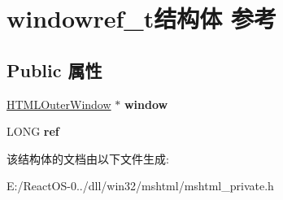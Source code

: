 \hypertarget{structwindowref__t}{}\section{windowref\+\_\+t结构体 参考}
\label{structwindowref__t}
\subsection*{Public 属性}
\begin{DoxyCompactItemize}
\item 
\mbox{\label{structwindowref__t_a7bdc605e4c2b1eca3e37b641a04366a0}} 
\hyperlink{struct_h_t_m_l_outer_window}{H\+T\+M\+L\+Outer\+Window} $\ast$ {\bfseries window}
\item 
\mbox{\label{structwindowref__t_ace6a6f59b0cfe8675d9259f3c92c8584}} 
L\+O\+NG {\bfseries ref}
\end{DoxyCompactItemize}


该结构体的文档由以下文件生成\+:\begin{DoxyCompactItemize}
\item 
E\+:/\+React\+O\+S-\/0../dll/win32/mshtml/mshtml\+\_\+private.\+h\end{DoxyCompactItemize}
